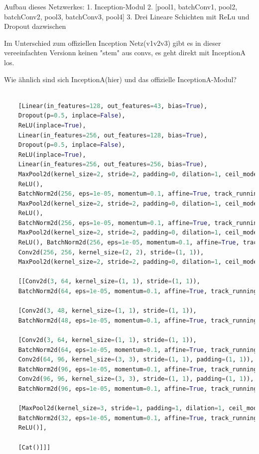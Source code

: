 \documentclass[twoside, 11pt,a4paper]{article}
\numberwithin{equation}{section}
\begin{document}
	Aufbau dieses Netzwerkes:
	 1. Inception-Modul
	 2. [pool1, batchConv1, pool2, batchConv2, pool3, batchConv3, pool4]
	 3. Drei Lineare Schichten mit ReLu und Dropout dazwischen
	
	Im Unterschied zum offiziellen Inception Netz(v1v2v3) gibt es in dieser 
	 vereeinfachten Versionn keinen "stem" aus convs, 
	 es geht direkt mit InceptionA los.
	
	 Wie ähnlich sind sich InceptionA(hier) und das offizielle InceptionA-Modul?
	\begin{lstlisting}[language=Python, caption=Reversed Model incv3]
	
	[Linear(in_features=128, out_features=43, bias=True), 
	Dropout(p=0.5, inplace=False), 
	ReLU(inplace=True), 
	Linear(in_features=256, out_features=128, bias=True), 
	Dropout(p=0.5, inplace=False), 
	ReLU(inplace=True), 
	Linear(in_features=256, out_features=256, bias=True), 
	MaxPool2d(kernel_size=2, stride=2, padding=0, dilation=1, ceil_mode=False), 
	ReLU(), 
	BatchNorm2d(256, eps=1e-05, momentum=0.1, affine=True, track_running_stats=True), Conv2d(256, 256, kernel_size=(2, 2), stride=(1, 1)), 
	MaxPool2d(kernel_size=2, stride=2, padding=0, dilation=1, ceil_mode=False), 
	ReLU(), 
	BatchNorm2d(256, eps=1e-05, momentum=0.1, affine=True, track_running_stats=True), Conv2d(256, 256, kernel_size=(2, 2), stride=(1, 1)), 
	MaxPool2d(kernel_size=2, stride=2, padding=0, dilation=1, ceil_mode=False), 
	ReLU(), BatchNorm2d(256, eps=1e-05, momentum=0.1, affine=True, track_running_stats=True), 
	Conv2d(256, 256, kernel_size=(2, 2), stride=(1, 1)), 
	MaxPool2d(kernel_size=2, stride=2, padding=0, dilation=1, ceil_mode=False),
	
	[[Conv2d(3, 64, kernel_size=(1, 1), stride=(1, 1)), 
	BatchNorm2d(64, eps=1e-05, momentum=0.1, affine=True, track_running_stats=True), ReLU()], 
	
	[Conv2d(3, 48, kernel_size=(1, 1), stride=(1, 1)), 
	BatchNorm2d(48, eps=1e-05, momentum=0.1, affine=True, track_running_stats=True), ReLU(), Conv2d(48, 64, kernel_size=(5, 5), stride=(1, 1), padding=(2, 2)), BatchNorm2d(64, eps=1e-05, momentum=0.1, affine=True, track_running_stats=True), ReLU()], 
	
	[Conv2d(3, 64, kernel_size=(1, 1), stride=(1, 1)), 
	BatchNorm2d(64, eps=1e-05, momentum=0.1, affine=True, track_running_stats=True), ReLU(), 
	Conv2d(64, 96, kernel_size=(3, 3), stride=(1, 1), padding=(1, 1)), 
	BatchNorm2d(96, eps=1e-05, momentum=0.1, affine=True, track_running_stats=True), ReLU(), 
	Conv2d(96, 96, kernel_size=(3, 3), stride=(1, 1), padding=(1, 1)), 
	BatchNorm2d(96, eps=1e-05, momentum=0.1, affine=True, track_running_stats=True), ReLU()], 
	
	[MaxPool2d(kernel_size=3, stride=1, padding=1, dilation=1, ceil_mode=False), Conv2d(3, 32, kernel_size=(1, 1), stride=(1, 1)), 
	BatchNorm2d(32, eps=1e-05, momentum=0.1, affine=True, track_running_stats=True), 
	ReLU()], 
	
	[Cat()]]]
	\end{lstlisting}
\end{document}
